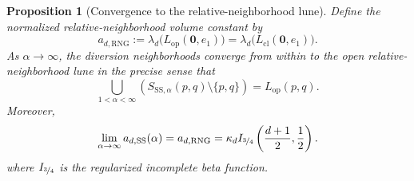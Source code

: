\documentclass[a4paper,fleqn]{cas-dc}
\newtheorem{proposition}{Proposition}
\theoremstyle{definition}
\theoremstyle{remark}
\newcommand{\0}{\mathbf{0}}
\begin{document}
\begin{proposition}[Convergence to the relative-neighborhood lune]
\label{prop:rng-limit}
Define the normalized relative-neighborhood volume constant by
\begin{equation}
    a_{d,\mathrm{RNG}}
    :=
    \lambda_d\bigl(L_{\mathrm{op}}(\0,e_1)\bigr)
    =
    \lambda_d\bigl(L_{\mathrm{cl}}(\0,e_1)\bigr).
\end{equation}
As $\alpha\to\infty$, the diversion neighborhoods converge from within to
the open relative-neighborhood lune in the precise sense that
\begin{equation}\label{eq:open-lune-limit}
\bigcup_{1<\alpha<\infty}
\left(S_{\mathrm{SS},\alpha}(p,q)\setminus\{p,q\}\right)
=
L_{\mathrm{op}}(p,q).
\end{equation}
Moreover,
\begin{equation}\label{eq:rng-constant}
    \lim_{\alpha\to\infty}
    a_{d,\mathrm{SS}}(\alpha)
    =
    a_{d,\mathrm{RNG}}
    =
    \kappa_d
    I_{\nicefrac{3}{4}}\left(\frac{d+1}{2},\frac12\right).
\end{equation}
where $I_{\nicefrac{3}{4}}$ is the regularized incomplete beta function.

\end{proposition}
\end{document}
